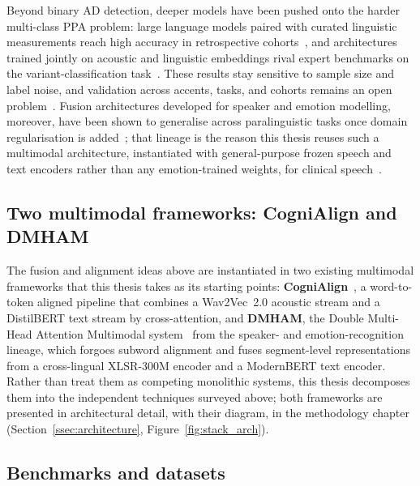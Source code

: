 Beyond binary AD detection, deeper models have been pushed onto the harder multi-class PPA problem: large language models paired with curated linguistic measurements reach high accuracy in retrospective cohorts~\cite{rezaii2024ppallm}, and architectures trained jointly on acoustic and linguistic embeddings rival expert benchmarks on the variant-classification task~\cite{themistocleous2021automatic}. These results stay sensitive to sample size and label noise, and validation across accents, tasks, and cohorts remains an open problem~\cite{nevler2019validated}.
Fusion architectures developed for speaker and emotion modelling, moreover, have been shown to generalise across paralinguistic tasks once domain regularisation is added~\cite{naini2025interspeechser}; that lineage is the reason this thesis reuses such a multimodal architecture, instantiated with general-purpose frozen speech and text encoders rather than any emotion-trained weights, for clinical speech~\cite{esteve2025speechadppa}.

\subsection{Two multimodal frameworks: CogniAlign and DMHAM}
\label{ssec:frameworks}

The fusion and alignment ideas above are instantiated in two existing multimodal frameworks that this thesis takes as its starting points: \textbf{CogniAlign}~\cite{ortiz2025cognialign}, a word-to-token aligned pipeline that combines a Wav2Vec~2.0 acoustic stream and a DistilBERT text stream by cross-attention, and \textbf{DMHAM}, the Double Multi-Head Attention Multimodal system~\cite{naini2025interspeechser,esteve2025speechadppa} from the speaker- and emotion-recognition lineage, which forgoes subword alignment and fuses segment-level representations from a cross-lingual XLSR-300M encoder and a ModernBERT text encoder. Rather than treat them as competing monolithic systems, this thesis decomposes them into the independent techniques surveyed above; both frameworks are presented in architectural detail, with their diagram, in the methodology chapter (Section~\ref{ssec:architecture}, Figure~\ref{fig:stack_arch}).

\subsection{Benchmarks and datasets}

